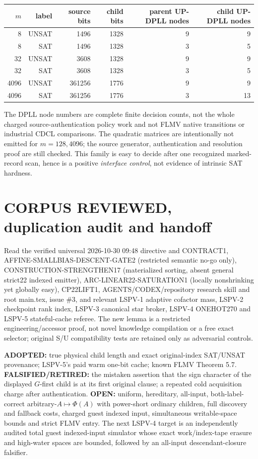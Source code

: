 \documentclass[11pt]{article}
\begin{document}
\begin{center}\small
\begin{tabular}{rrrrrr}\toprule
$m$ & label & source bits & child bits & parent UP-DPLL nodes & child UP-DPLL nodes\\\midrule
8 & UNSAT &1496&1328&9&9\\
8 & SAT &1496&1328&3&5\\
32 & UNSAT &3608&1328&9&9\\
32 & SAT &3608&1328&3&5\\
4096 & UNSAT &361256&1776&9&9\\
4096 & SAT &361256&1776&3&13\\\bottomrule
\end{tabular}
\end{center}
The DPLL node numbers are complete finite decision counts, not the whole charged source-authentication policy work and not FLMV native transitions or industrial CDCL comparisons. The quadratic matrices are intentionally not emitted for $m=128,4096$; the source generator, authentication and resolution proof are still checked. This family is easy to decide after one recognized marked-record scan, hence is a positive \emph{interface control}, not evidence of intrinsic SAT hardness.

\section{CORPUS REVIEWED, duplication audit and handoff}
Read the verified universal 2026-10-30 09:48 directive and CONTRACT1, AFFINE-SMALLBIAS-DESCENT-GATE2 (restricted semantic no-go only), CONSTRUCTION-STRENGTHEN17 (materialized sorting, absent general strict22 indexed emitter), ARC-LINEAR22-SATURATION1 (locally nonshrinking yet globally easy), CP22LIFT1, AGENTS/CODEX/repository research skill and root main.tex, issue \#3, and relevant LSPV-1 adaptive cofactor mass, LSPV-2 checkpoint rank index, LSPV-3 canonical star broker, LSPV-4 ONEHOT270 and LSPV-5 stateful-cache referee. The new lemma is a restricted engineering/accessor proof, not novel knowledge compilation or a free exact selector; original S/U compatibility tests are retained only as adversarial controls.

\textbf{ADOPTED:} true physical child length and exact original-index SAT/UNSAT provenance; LSPV-5's paid warm one-bit cache; known FLMV Theorem 5.7. \textbf{FALSIFIED/RETIRED:} the mistaken assertion that the sign character of the displayed $G$-first child is at its first original clause; a repeated cold acquisition charge after authentication. \textbf{OPEN:} uniform, hereditary, all-input, both-label-correct arbitrary-$A\mapsto\Phi(A)$ with power-short ordinary children, full discovery and fallback costs, charged guest indexed input, simultaneous writable-space bounds and strict FLMV entry. The next LSPV-4 target is an independently audited total guest indexed-input simulator whose exact work/index-tape erasure and high-water spaces are bounded, followed by an all-input descendant-closure falsifier.
\end{document}
